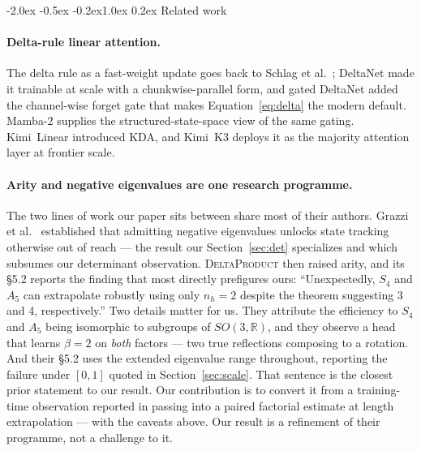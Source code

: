 \documentclass[10pt,twocolumn]{article}
\makeatletter
\renewcommand\section{\@startsection{section}{1}{\z@}%
  {-2.0ex \@plus -0.5ex \@minus -0.2ex}{1.0ex \@plus 0.2ex}%
  {\normalfont\large\bfseries}}
\makeatother
\begin{document}
\section{Related work}
\label{sec:related}

\paragraph{Delta-rule linear attention.}
The delta rule as a fast-weight update goes back to Schlag et al.\
\cite{schlag2021fwp}; DeltaNet \cite{yang2024deltanet} made it trainable at
scale with a chunkwise-parallel form, and gated DeltaNet \cite{yang2024gated}
added the channel-wise forget gate that makes Equation~\eqref{eq:delta} the
modern default. Mamba-2 \cite{dao2024mamba2} supplies the structured-state-space
view of the same gating. Kimi~Linear \cite{kimi2025linear} introduced KDA, and
Kimi~K3 \cite{kimi2026k3} deploys it as the majority attention layer at frontier
scale.

\paragraph{Arity and negative eigenvalues are one research programme.}
The two lines of work our paper sits between share most of their authors.
Grazzi et al.\ \cite{grazzi2024negative} established that admitting negative
eigenvalues unlocks state tracking otherwise out of reach --- the result our
Section~\ref{sec:det} specializes and which subsumes our determinant
observation. \textsc{DeltaProduct} \cite{siems2025deltaproduct} then raised
arity, and its \S5.2 reports the finding that most directly prefigures ours:
``Unexpectedly, $S_4$ and $A_5$ can extrapolate robustly using only $n_h = 2$
despite the theorem suggesting 3 and 4, respectively.'' Two details matter for
us. They attribute the efficiency to $S_4$ and $A_5$ being isomorphic to
subgroups of $SO(3,\mathbb{R})$, and they observe a head that learns $\beta=2$
on \emph{both} factors --- two true reflections composing to a rotation. And
their \S5.2 uses the extended eigenvalue range throughout, reporting the failure
under $[0,1]$ quoted in Section~\ref{sec:scale}. That sentence is the
closest prior statement to our result. Our contribution is to convert it from a
training-time observation reported in passing into a paired factorial estimate
at length extrapolation --- with the caveats above. Our result is a refinement of
their programme, not a challenge to it.
\end{document}
